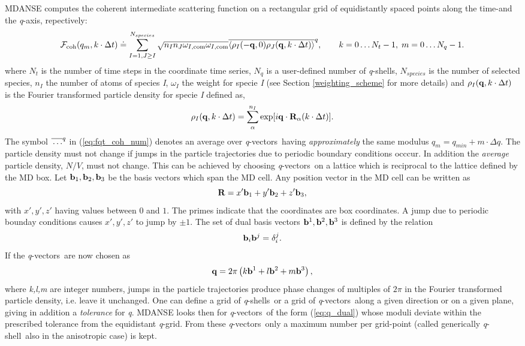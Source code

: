 \documentclass[a4paper,11pt]{article}
\newcommand{\qval}{\textit{q}}
\newcommand{\qvects}{\textit{q}-vectors}
\newcommand{\qshell}{\textit{q}-shell}
\newcommand{\qshells}{\textit{q}-shells}
\begin{document}
\gls{MDANSE} computes the coherent intermediate scattering function on a rectangular grid of equidistantly spaced points along 
the time-and the \qval-axis, repectively:
\begin{equation} 
\label{eq:fqt_coh_num}
{\cal F}_{\mathrm{coh}}(q_m,k\cdot\Delta t) \doteq \sum^{N_{species}}_{I=1,J\geq I} \sqrt{n_I n_J \omega_{I,\mathrm{com}}\omega_{I,\mathrm{com}}}
\overline{\langle \rho_I(-{\bf q},0)\rho_J({\bf q},k\cdot\Delta t) \rangle}^{q},
\qquad k = 0\ldots N_t - 1,\; m = 0\ldots N_q - 1. 
\end{equation} 
where $N_t$ is the number of time steps in the coordinate time series, $N_q$ is a user-defined number of \qshells, 
$N_{species}$ is the number of selected species, $n_I$ the number of atoms of species \textit{I}, $\omega_I$ the weight for specie 
\textit{I} (see Section \ref{weighting_scheme} for more details) and $\rho_I({\bf q},k\cdot\Delta t)$ is the Fourier transformed particle 
density for specie \textit{I} defined as,
\begin{equation}
\label{eq:dcsf_rho}
\rho_I({\bf q},k\cdot\Delta t) = \sum_\alpha^{n_I} \exp[i{\bf q}\cdot{\bf R}_\alpha(k\cdot\Delta t)].
\end{equation}
The symbol $\overline{\rule{0pt}{5pt}\ldots}^{q}$ in (\ref{eq:fqt_coh_num}) denotes an average over \qvects\ having 
{\em approximately} the same modulus $q_m = q_{min} + m\cdot\Delta q$. The particle density must not change if jumps in 
the particle trajectories due to periodic boundary conditions occcur. In addition the {\em average} particle density, 
$N/V$, must not change. This can be achieved by choosing \qvects\ on a lattice which is reciprocal to the lattice defined 
by the \gls{MD} box. Let ${\bf b}_1,{\bf b}_2,{\bf b}_3$ be the basis vectors which span the \gls{MD} cell. Any position vector in the 
\gls{MD} cell can be written as
\begin{equation}
{\bf R} = x'{\bf b}_1 + y'{\bf b}_2 + z'{\bf b}_3,
\end{equation}
with $x',y',z'$ having values between $0$ and $1$.  The primes indicate that the coordinates are box coordinates. A jump due 
to periodic bounday conditions causes $x',y',z'$ to jump by $\pm 1$.  The set of dual basis vectors ${\bf b}^1,{\bf b}^2,{\bf b}^3$ 
is defined by the relation
\begin{equation}
{\bf b}_i{\bf b}^j = \delta_i^j.
\end{equation}
If the \qvects\ are now chosen as
\begin{equation}
\label{eq:q_dual}
{\bf q} = 2\pi\left(k{\bf b}^1 + l{\bf b}^2 + m{\bf b}^3\right),
\end{equation}
where \textit{k,l,m} are integer numbers, jumps in the particle trajectories produce phase changes of multiples of $2\pi$ in the 
Fourier transformed particle density, i.e. leave it unchanged. One can define a grid of \qshells\ or a grid of \qvects\ 
along a given direction or on a given plane, giving in addition a {\em tolerance} for \qval. \gls{MDANSE} looks then for 
\qvects\ of the form (\ref{eq:q_dual}) whose moduli deviate within the prescribed tolerance from the equidistant \qval-grid. 
From these \qvects\ only a maximum number per grid-point (called generically \qshell\ also in the anisotropic case) is 
kept.
\end{document}
